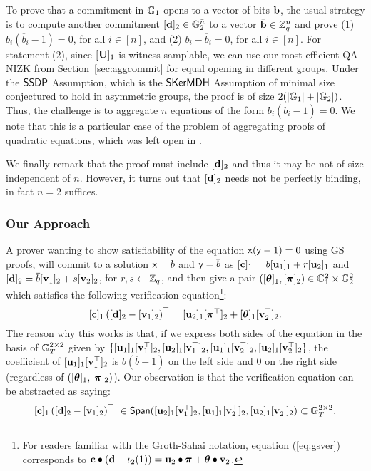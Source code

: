 To prove that a commitment in $\mathbb{G}_1$ opens to a vector of bits $\mathbf{b}$, the usual strategy is to compute another commitment $[\mathbf{d}]_2\in\mathbb{G}_2^{\bar{n}}$ to a vector $\bar{\mathbf{b}}\in\mathbb{Z}_q^n$ and prove 
  (1) $b_i(\overline{b}_i-1)=0$, for all $i \in [n]$, and 
  (2) $b_i-\overline{b}_i=0$, for all $i \in [n]$. 
For statement  (2), since $[\mathbf{{U}}]_1$ is witness samplable, we can use our most efficient QA-NIZK from Section~\ref{sec:aggcommit} for equal opening in different groups.  Under the $\mathsf{SSDP}$ Assumption, which is the $\mathsf{SKerMDH}$ Assumption of minimal size conjectured to hold in asymmetric groups, the proof is of size $2(|\mathbb{G}_1|+|\mathbb{G}_2|)$. Thus, the challenge is to aggregate $n$ equations of the form $b_i(\overline{b}_i-1)=0$. We note that this is a particular case of the problem of aggregating proofs of quadratic equations, which was left open in \cite{C:JutRoy14}.

We finally remark that the proof must include $[\mathbf{d}]_2$ and thus it may be not of size independent of $n$. However, it turns out that $[\mathbf{d}]_2$ needs not be perfectly binding, in fact $\bar{n}=2$ suffices.

\subsubsection{Our Approach}

A prover wanting to show satisfiability of the equation  $\mathsf{x}(\mathsf{y}-1)=0$ using GS proofs, will commit to a solution  
$\mathsf{x}=b$ and $\mathsf{y}=\overline{b}$ as $[\mathbf{c}]_1=b [\mathbf{u}_1]_1 + r [\mathbf{u}_2]_1$ and 
 $[\mathbf{d}]_2=\overline{b} [\mathbf{v}_1]_2 + s [\mathbf{v}_2]_2$, for $r,s \leftarrow \mathbb{Z}_q$, and then give a pair $([{\boldsymbol \theta}]_1,[{\boldsymbol \pi}]_2)
\in \mathbb{G}_1^{2} \times \mathbb{G}_2^{2}$ which satisfies the following verification equation\footnote{For readers familiar with the Groth-Sahai notation, equation (\ref{eq:gsver}) corresponds to 
$\mathbf{c} \bullet \left(\mathbf{d}-\iota_2(1)\right) = \mathbf{u}_2 \bullet {\boldsymbol \pi} + {\boldsymbol \theta} \bullet \mathbf{v}_2$.}:
\begin{equation} \label{eq:gsver}
[\mathbf{c}]_1 \left([\mathbf{d}]_2-
 [{\mathbf{v}}_1]_2\right)^{\top}=[{\mathbf{u}}_2]_1  
[{\boldsymbol \pi}^{\top}]_2+ [{\boldsymbol \theta}]_1   [\mathbf{v}_2^{\top}]_2. 
\end{equation}
The reason why this works is that, if we express both sides of the equation in the basis of 
$\mathbb{G}_T^{2\times 2}$ given by 
$\{[\mathbf{u}_1]_1[\mathbf{v}_1^\top]_2,[\mathbf{u}_2]_1[\mathbf{v}_1^\top]_2,[\mathbf{u}_1]_1[\mathbf{v}_2^\top]_2,[\mathbf{u}_2]_1[\mathbf{v}_2^\top]_2\}$, the coefficient of 
$[\mathbf{u}_1]_1[\mathbf{v}_1^\top]_2$ is $b(\overline{b}-1)$ on the left side and $0$ on the right side (regardless of
$([{\boldsymbol \theta}]_1,[{\boldsymbol \pi}]_2)$).
Our observation is that the verification equation can be abstracted as saying:
\begin{equation}\label{eq:gsabstracted}
[\mathbf{c}]_1 \left([\mathbf{d}]_2-[\mathbf{v}_1]_2\right)^{\top} \ \in \mathsf{Span}([\mathbf{u}_2]_1[\mathbf{v}_1^\top]_2,[\mathbf{u}_1]_1[\mathbf{v}_2^\top]_2,[\mathbf{u}_2]_1[\mathbf{v}_2^\top]_2) \subset  \mathbb{G}_T^{2 \times 2}. 
\end{equation}

